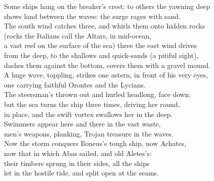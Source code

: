\documentclass[12pt, a5paper]{minimal}
\begin{document}
Some ships hang on the breaker's crest: to others the yawning deep\\
shows land between the waves: the surge rages with sand.\\
The south wind catches three, and whirls them onto hidden rocks\\
(rocks the Italians call the Altars, in mid-ocean,\\
a vast reef on the surface of the sea) three the east wind drives\\
from the deep, to the shallows and quick-sands (a pitiful sight),\\
dashes them against the bottom, covers them with a gravel mound.\\
A huge wave, toppling, strikes one astern, in front of his very eyes,\\
one carrying faithful Orontes and the Lycians.\\
The steersman's thrown out and hurled headlong, face down:\\
but the sea turns the ship three times, driving her round,\\
in place, and the swift vortex swallows her in the deep.\\
Swimmers appear here and there in the vast waste,\\
men's weapons, planking, Trojan treasure in the waves.\\
Now the storm conquers Iloneus's tough ship, now Achates,\\
now that in which Abas sailed, and old Aletes's:\\
their timbers sprung in their sides, all the ships\\
let in the hostile tide, and split open at the seams.
\end{document}
